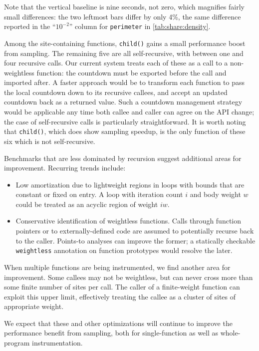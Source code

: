 Note that the vertical baseline is nine seconds, not zero, which
magnifies fairly small differences: the two leftmost bars differ by
only 4\%, the same difference reported in the ``$10^{-2}$'' column for
\texttt{perimeter} in \autoref{tab:share:density}.

Among the site-containing functions, \texttt{child()} gains a small
performance boost from sampling.  The remaining five are all
self-recursive, with between one and four recursive calls.  Our
current system treats each of these as a call to a non-weightless
function: the countdown must be exported before the call and imported
after.  A faster approach would be to transform each function to pass
the local countdown down to its recursive callees, and accept an
updated countdown back as a returned value.  Such a countdown
management strategy would be applicable any time both callee and
caller can agree on the API change; the case of self-recursive calls
is particularly straightforward.  It is worth noting that
\texttt{child()}, which does show sampling speedup, is the only
function of these six which is not self-recursive.

Benchmarks that are less dominated by recursion suggest additional
areas for improvement.  Recurring trends include:

\begin{itemize}
\item Low amortization due to lightweight regions in loops with bounds
  that are constant or fixed on entry.  A loop with iteration count
  $i$ and body weight $w$ could be treated as an acyclic region of
  weight $iw$.

\item Conservative identification of weightless functions.  Calls
  through function pointers or to externally-defined code are assumed
  to potentially recurse back to the caller.  Points-to analyses can
  improve the former; a statically checkable \texttt{weightless}
  annotation on function prototypes would resolve the later.
\end{itemize}

When multiple functions are being instrumented, we find another area
for improvement.  Some callees may not be weightless, but can never
cross more than some finite number of sites per call.  The caller of a
finite-weight function can exploit this upper limit, effectively
treating the callee as a cluster of sites of appropriate weight.

We expect that these and other optimizations will continue to improve
the performance benefit from sampling, both for single-function as
well as whole-program instrumentation.

